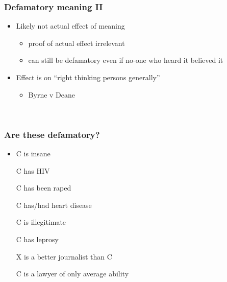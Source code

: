 \documentclass[ignorenonframetext,]{beamer}
\begin{document}
\begin{frame}
\frametitle{Defamatory meaning II}

\begin{itemize}
\item  {Likely} not {actual} effect of meaning

  \begin{itemize}
  \item    proof of actual effect irrelevant
  \item    can still be defamatory even if no-one who heard it believed
    it
  \end{itemize}
\item  Effect is on ``right thinking persons generally''

  \begin{itemize}
  \item    Byrne v Deane
  \end{itemize}
\end{itemize}

~


\end{frame}

\begin{frame}
\frametitle{Are these defamatory?}

\begin{itemize}
\item  C is insane

  C has HIV

  C has been raped

  C has/had heart disease

  C is illegitimate

  C has leprosy

  X is a better journalist than C

  C is a lawyer of only average ability
\end{itemize}

~


\end{frame}
\end{document}
